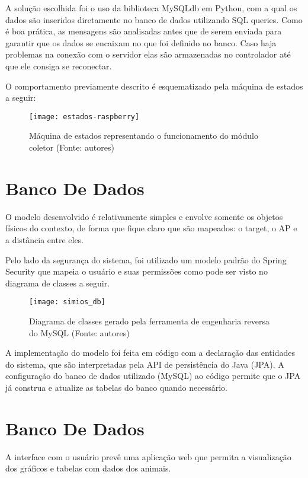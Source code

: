 A solução escolhida foi o uso da biblioteca MySQLdb em Python, com a qual os dados são inseridos diretamente no banco de dados utilizando SQL queries. Como é boa prática, as mensagens são analisadas antes que de serem enviada para garantir que os dados se encaixam no que foi definido no banco. Caso haja problemas na conexão com o servidor elas são armazenadas no controlador até que ele consiga se reconectar.

O comportamento previamente descrito é esquematizado pela máquina de estados a seguir:

\begin{figure}[ht]
  \centering
    \texttt{[image: estados-raspberry]}
  \caption{Máquina de estados representando o funcionamento do módulo coletor (Fonte: autores)}
\end{figure}
\FloatBarrier

\section{Banco De Dados}

O modelo desenvolvido é relativamente simples e envolve somente os objetos físicos do contexto, de forma que fique claro que são mapeados: o target, o AP e a distância entre eles.

Pelo lado da segurança do sistema, foi utilizado um modelo padrão do Spring Security que mapeia o usuário e suas permissões como pode ser visto no diagrama de classes a seguir.

\begin{figure}[ht]
  \centering
    \texttt{[image: simios\_db]}
  \caption{Diagrama de classes gerado pela ferramenta de engenharia reversa do MySQL (Fonte: autores)}
\end{figure}
\FloatBarrier

A implementação do modelo foi feita em código com a declaração das entidades do sistema, que são interpretadas pela API de persistência do Java (JPA). A configuração do banco de dados utilizado (MySQL) ao código permite que o JPA já construa e atualize as tabelas do banco quando necessário.

\section{Banco De Dados}

A interface com o usuário prevê uma aplicação web que permita a visualização dos gráficos e tabelas com dados dos animais.

